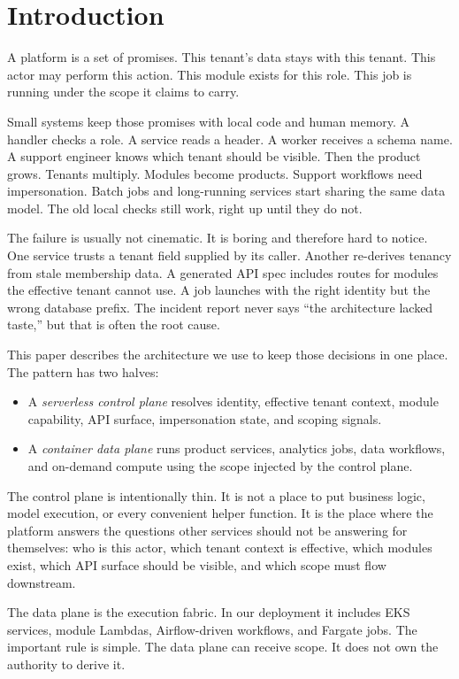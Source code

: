 \section{Introduction}

A platform is a set of promises. This tenant's data stays with this tenant. This actor may perform this action. This module exists for this role. This job is running under the scope it claims to carry.

Small systems keep those promises with local code and human memory. A handler checks a role. A service reads a header. A worker receives a schema name. A support engineer knows which tenant should be visible. Then the product grows. Tenants multiply. Modules become products. Support workflows need impersonation. Batch jobs and long-running services start sharing the same data model. The old local checks still work, right up until they do not.

The failure is usually not cinematic. It is boring and therefore hard to notice. One service trusts a tenant field supplied by its caller. Another re-derives tenancy from stale membership data. A generated API spec includes routes for modules the effective tenant cannot use. A job launches with the right identity but the wrong database prefix. The incident report never says ``the architecture lacked taste,'' but that is often the root cause.

This paper describes the architecture we use to keep those decisions in one place. The pattern has two halves:

\begin{itemize}
  \item A \emph{serverless control plane} resolves identity, effective tenant context, module capability, API surface, impersonation state, and scoping signals.
  \item A \emph{container data plane} runs product services, analytics jobs, data workflows, and on-demand compute using the scope injected by the control plane.
\end{itemize}

The control plane is intentionally thin. It is not a place to put business logic, model execution, or every convenient helper function. It is the place where the platform answers the questions other services should not be answering for themselves: who is this actor, which tenant context is effective, which modules exist, which API surface should be visible, and which scope must flow downstream.

The data plane is the execution fabric. In our deployment it includes EKS services, module Lambdas, Airflow-driven workflows, and Fargate jobs. The important rule is simple. The data plane can receive scope. It does not own the authority to derive it.

